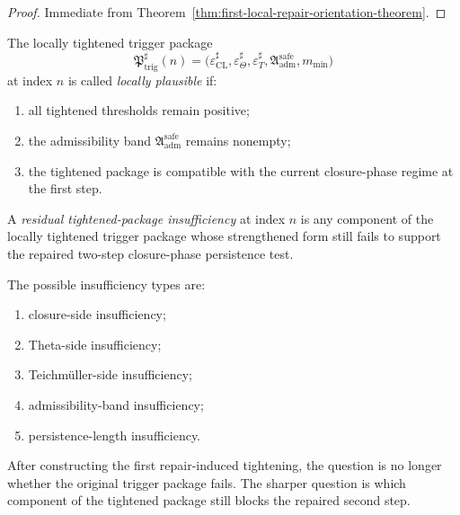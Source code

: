\begin{proof}
Immediate from Theorem~\ref{thm:first-local-repair-orientation-theorem}.
\end{proof}




\begin{definition}
\label{def:locally-plausible-tightened-trigger-package}
The locally tightened trigger package
\[
\mathfrak{P}_{\mathrm{trig}}^{\sharp}(n)
=
\bigl(
\varepsilon_{\mathrm{CL}}^{\sharp},
\varepsilon_{\Theta}^{\sharp},
\varepsilon_{T}^{\sharp},
\mathfrak{A}_{\mathrm{adm}}^{\mathrm{safe}},
m_{\min}
\bigr)
\]
at index $n$ is called \emph{locally plausible} if:
\begin{enumerate}
 \item all tightened thresholds remain positive;
 \item the admissibility band $\mathfrak{A}_{\mathrm{adm}}^{\mathrm{safe}}$ remains nonempty;
 \item the tightened package is compatible with the current closure-phase regime at the first step.
\end{enumerate}
\end{definition}

\begin{definition}
\label{def:residual-tightened-package-insufficiency}
A \emph{residual tightened-package insufficiency} at index $n$ is any component of the locally tightened trigger package whose strengthened form still fails to support the repaired two-step closure-phase persistence test.

The possible insufficiency types are:
\begin{enumerate}
 \item closure-side insufficiency;
 \item Theta-side insufficiency;
 \item Teichm\"uller-side insufficiency;
 \item admissibility-band insufficiency;
 \item persistence-length insufficiency.
\end{enumerate}
\end{definition}

\begin{remark}
\label{rem:what-the-new-audit-should-decide}
After constructing the first repair-induced tightening, the question is no longer whether the original trigger package fails.
The sharper question is which component of the tightened package still blocks the repaired second step.
\end{remark}

